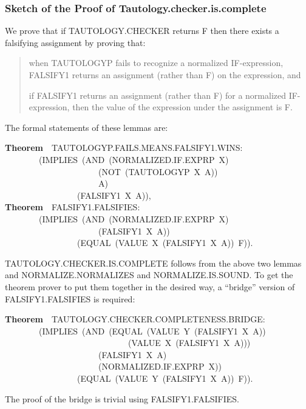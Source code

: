 \documentclass[10pt]{book}
\newenvironment{pubasis}{\begin{flushleft}}{\end{flushleft}}
\newenvironment{pubcrown}{\begin{quote}}{\end{quote}}
\newcommand{\axiomordefinition}[1]{\vspace{6pt}\Large\textsf{\textbf{#1}}\normalsize}
\begin{document}
\subsubsection{Sketch of the Proof of Tautology.checker.is.complete}
We prove that  if TAUTOLOGY.CHECKER returns F then there exists
a falsifying assignment by proving that:
\begin{pubcrown}
when TAUTOLOGYP fails to recognize a normalized IF-expression,
FALSIFY1 returns an assignment (rather than F) on the expression, and

if FALSIFY1 returns an assignment (rather than F) for a normalized IF-expression,
then the value of the expression under the assignment is F.
\end{pubcrown}

The formal statements of these lemmas are:
\begin{pubasis}
\axiomordefinition{Theorem}~~TAUTOLOGYP.FAILS.MEANS.FALSIFY1.WINS:\\
~~~~~~~~(IMPLIES~(AND~(NORMALIZED.IF.EXPRP~X)\\
~~~~~~~~~~~~~~~~~~~~~~(NOT~(TAUTOLOGYP~X~A))\\
~~~~~~~~~~~~~~~~~~~~~~A)\\
~~~~~~~~~~~~~~~~~(FALSIFY1~X~A)),\\

\axiomordefinition{Theorem}~~FALSIFY1.FALSIFIES:\\
~~~~~~~~(IMPLIES~(AND~(NORMALIZED.IF.EXPRP~X)\\
~~~~~~~~~~~~~~~~~~~~~~(FALSIFY1~X~A))\\
~~~~~~~~~~~~~~~~~(EQUAL~(VALUE~X~(FALSIFY1~X~A))~F)).\\
\end{pubasis}
TAUTOLOGY.CHECKER.IS.COMPLETE follows from the above two
lemmas and NORMALIZE.NORMALIZES and NORMALIZE.IS.SOUND.  To get
the theorem prover to put them together in the desired way,
a ``bridge'' version of FALSIFY1.FALSIFIES is required:
\begin{pubasis}
\axiomordefinition{Theorem}~~TAUTOLOGY.CHECKER.COMPLETENESS.BRIDGE:\\
~~~~~~~~(IMPLIES~(AND~(EQUAL~(VALUE~Y~(FALSIFY1~X~A))\\
~~~~~~~~~~~~~~~~~~~~~~~~~~~~~(VALUE~X~(FALSIFY1~X~A)))\\
~~~~~~~~~~~~~~~~~~~~~~(FALSIFY1~X~A)\\
~~~~~~~~~~~~~~~~~~~~~~(NORMALIZED.IF.EXPRP~X))\\
~~~~~~~~~~~~~~~~~(EQUAL~(VALUE~Y~(FALSIFY1~X~A))~F)).\\
\end{pubasis}
The proof of the bridge is trivial using FALSIFY1.FALSIFIES.
\end{document}
